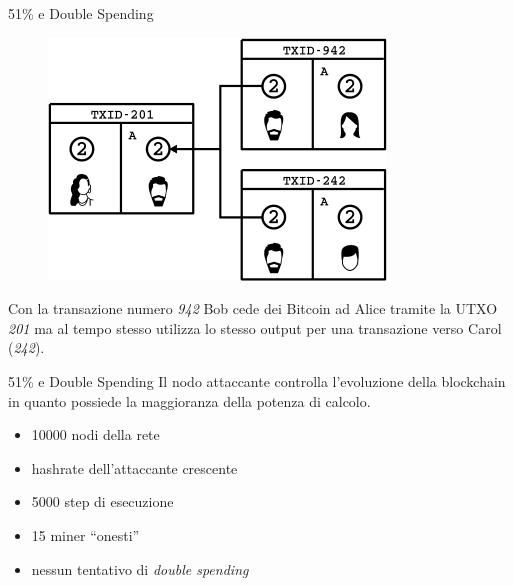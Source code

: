 \documentclass{beamer}
\begin{document}
\begin{frame}{51\% e Double Spending}
	\begin{figure}
		\centering
        \includegraphics[width=0.7\linewidth]{./images/double_spending.png}
	\end{figure}
    Con la transazione numero \emph{942} Bob cede dei Bitcoin ad Alice tramite la UTXO \emph{201} ma al tempo stesso utilizza lo stesso output per una transazione verso Carol (\emph{242}).
\end{frame}

\begin{frame}{51\% e Double Spending}
	Il nodo attaccante controlla l'evoluzione della blockchain in quanto possiede la maggioranza della potenza di calcolo.
    
    \begin{itemize}
    	\item 10000 nodi della rete
        \item hashrate dell'attaccante crescente
        \item 5000 step di esecuzione
        \item 15 miner ``onesti''
        \item nessun tentativo di \textit{double spending}
    \end{itemize}
\end{frame}

%            
\end{document}
